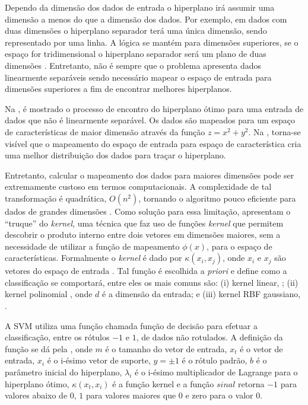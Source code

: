Dependo da dimensão dos dados de entrada o hiperplano irá assumir uma dimensão a menos do que a dimensão dos dados. Por exemplo, em dados com duas dimensões o hiperplano separador terá uma única dimensão, sendo representado por uma linha. A lógica se mantém para dimensões superiores, se o espaço for tridimensional o hiperplano separador será um plano de duas dimensões \cite{hamel2011knowledge}. Entretanto, não é sempre que o problema apresenta dados linearmente separáveis sendo necessário mapear o espaço de entrada para dimensões superiores a fim de encontrar melhores hiperplanos.

Na , é mostrado o processo de encontro do hiperplano ótimo para uma entrada de dados que não é linearmente separável. Os dados são mapeados para um espaço de características de maior dimensão através da função $z = x^2 + y^2$. Na , torna-se visível que o mapeamento do espaço de entrada para espaço de característica cria uma melhor distribuição dos dados para traçar o hiperplano.

%

Entretanto, calcular o mapeamento dos dados para maiores dimensões pode ser extremamente custoso em termos computacionais. A complexidade de tal transformação é quadrática, $O(n^2)$, tornando o algoritmo pouco eficiente para dados de grandes dimensões \cite{hamel2011knowledge}. Como solução para essa limitação, \textcite{boser1992training} apresentam o ``truque'' do \textit{kernel}, uma técnica que faz uso de funções \textit{kernel} que permitem descobrir o produto interno entre dois vetores em dimensões maiores, sem a necessidade de utilizar a função de mapeamento $\phi(x)$, para o espaço de características. Formalmente o \textit{kernel} é dado por $\kappa(x_i, x_j)$, onde $x_i$ e $x_j$ são vetores do espaço de entrada \cite{scholkopf2001learning}. Tal função é escolhida a \textit{priori} e define como a classificação se comportará, entre eles os mais comuns são: (i) kernel linear, ; (ii) kernel polinomial , onde $d$ é a dimensão da entrada; e (iii) kernel RBF gaussiano, .


A \acrshort{SVM} utiliza uma função chamada função de decisão para efetuar a classificação, entre os rótulos $-1$ e $1$, de dados não rotulados. A definição da função se dá pela , onde $m$ é o tamanho do vetor de entrada, $x_t$ é o vetor de entrada, $x_i$ é o i-ésimo vetor de suporte, $y = \pm 1$ é o rótulo padrão, $b$ é o parâmetro inicial do hiperplano, $\lambda_i$ é o i-ésimo multiplicador de Lagrange para o hiperplano ótimo, $\kappa(x_t, x_i)$ é a função kernel e a função $sinal$ retorna $-1$ para valores abaixo de $0$, $1$ para valores maiores que $0$ e zero para o valor $0$.

